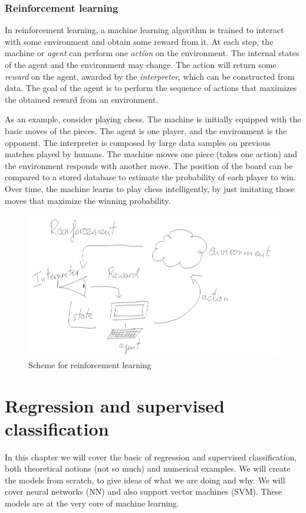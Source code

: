\documentclass[]{report}
\begin{document}
\subsection{Reinforcement learning}

In reinforcement learning, a machine learning algorithm is trained to interact with some environment and obtain some reward from it. At each step, the machine or \textit{agent} can perform one \textit{action} on the environment. The internal states of the agent and the environment may change. The action will return some \textit{reward} on the agent, awarded by the \textit{interpreter}, which can be constructed from data. The goal of the agent is to perform the sequence of actions that maximizes the obtained reward from an environment. 

As an example, consider playing chess. The machine is initially equipped with the basic moves of the pieces. The agent is one player, and the environment is the opponent. The interpreter is composed by large data samples on previous matches played by humans. The machine moves one piece (takes one action) and the environment responds with another move. The position of the board can be compared to a stored database to estimate the probability of each player to win. Over time, the machine learns to play chess intelligently, by just imitating those moves that maximize the winning probability. 

\begin{figure}
\includegraphics[width = .7\linewidth]{images/reinforcement-learning}
\caption{Scheme for reinforcement learning}
\label{fig.reinforcement-learning}

\end{figure}

\chapter{Regression and supervised classification}

In this chapter we will cover the basic of regression and supervised classification, both theoretical notions (not so much) and numerical examples. We will create the models from scratch, to give ideas of what we are doing and why. We will cover neural networks (NN) and also support vector machines (SVM). These models are at the very core of machine learning. 
\end{document}
